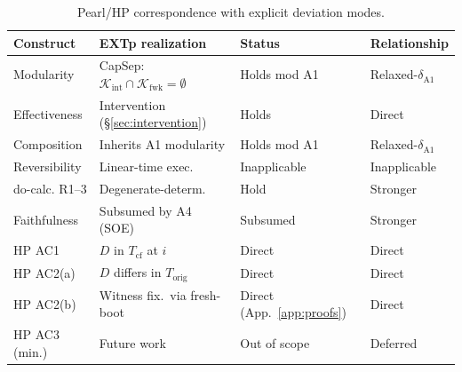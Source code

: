 \documentclass[conference]{IEEEtran}
\newcommand{\Korig}{T_\text{orig}}
\newcommand{\Tcf}{T_\text{cf}}
\newcommand{\Kint}{\mathcal{K}_\text{int}}
\newcommand{\Kfwk}{\mathcal{K}_\text{fwk}}
\begin{document}
\begin{table}[tb]
  \caption{Pearl/HP correspondence with explicit deviation modes.}
  \label{tab:pearl}
  \centering
  \footnotesize
  \begin{tabular}{@{}p{}p{}p{}p{}@{}}
  \toprule
  Construct & EXTp realization & Status & Relationship \\
  \midrule
  Modularity      & CapSep: $\Kint \cap \Kfwk = \emptyset$ & Holds mod A1     & Relaxed-$\delta_{\text{A1}}$ \\
  Effectiveness   & Intervention (\S\ref{sec:intervention})       & Holds            & Direct \\
  Composition     & Inherits A1 modularity         & Holds mod A1     & Relaxed-$\delta_{\text{A1}}$ \\
  Reversibility   & Linear-time exec.              & Inapplicable     & Inapplicable \\
  do-calc. R1--3  & Degenerate-determ.             & Hold             & Stronger \\
  Faithfulness    & Subsumed by A4 (SOE)           & Subsumed         & Stronger \\
  HP AC1          & $D$ in $\Tcf$ at $i$           & Direct           & Direct \\
  HP AC2(a)       & $D$ differs in $\Korig$        & Direct           & Direct \\
  HP AC2(b)       & Witness fix.\ via fresh-boot   & Direct (App.~\ref{app:proofs}) & Direct \\
  HP AC3 (min.)   & Future work                    & Out of scope     & Deferred \\
  \bottomrule
  \end{tabular}
\end{table}
\end{document}
